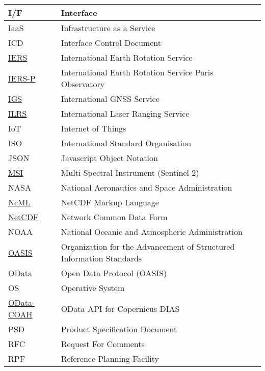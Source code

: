 \documentclass[dec_sum_main.tex]{subfiles}
\begin{document}
\begin{longtable}{|m{2.8cm}|m{10cm}|}
	I/F & Interface \\ \hline
	IaaS & Infrastructure as a Service \\ \hline
	ICD & Interface Control Document \\ \hline
	\href{https://www.iers.org/IERS/EN/Publications/Bulletins/bulletins.html}{IERS} & International Earth Rotation Service \\ \hline
	\href{https://hpiers.obspm.fr/}{IERS-P} & International Earth Rotation Service Paris Observatory\\ \hline
	\href{https://igs.org/about/#products}{IGS} & International GNSS Service \\ \hline
	\href{https://ilrs.gsfc.nasa.gov/data_and_products/data_centers/index.html}{ILRS} & International Laser Ranging Service \\ \hline
	IoT & Internet of Things \\ \hline
	ISO & International Standard Organisation \\ \hline
	JSON & Javascript Object Notation \\ \hline
	\href{https://sentinels.copernicus.eu/web/sentinel/technical-guides/sentinel-2-msi/msi-instrument}{MSI} & Multi-Spectral Instrument (Sentinel-2) \\ \hline
	NASA & National Aeronautics and Space Administration \\ \hline
    \href{https://www.unidata.ucar.edu/software/netcdf-java/v4.6/ncml/index.htm}{NcML} & NetCDF Markup Language \\ \hline
    \href{https://www.unidata.ucar.edu/software/netcdf/}{NetCDF} & Network Common Data Form \\ \hline
	NOAA & National Oceanic and Atmospheric Administration \\ \hline
	\href{https://www.oasis-open.org/}{OASIS} & Organization for the Advancement of Structured Information Standards \\ \hline
	\href{https://www.odata.org/documentation/}{OData} & Open Data Protocol (OASIS) \\ \hline
	OS & Operative System \\ \hline
	\href{https://scihub.copernicus.eu/twiki/do/view/SciHubUserGuide/ODataAPI?redirectedfrom=SciHubUserGuide.7ODataAPI}{OData-COAH} & OData API for Copernicus DIAS \\ \hline
	PSD & Product Specification Document \\ \hline
	RFC & Request For Comments \\ \hline
	RPF & Reference Planning Facility \\ \hline

\end{longtable}
\end{document}
